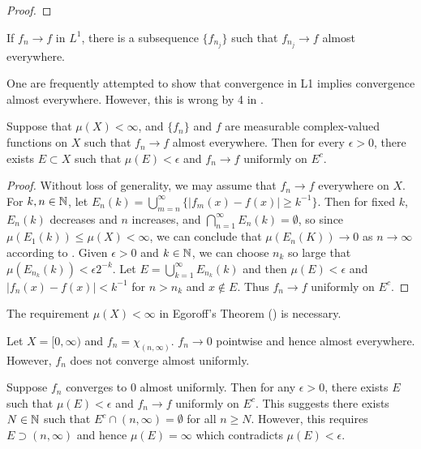 \begin{proof}
    
\end{proof}

\begin{corollary}
    If $f_n \to f$ in $L^1$, there is a subsequence $\{ f_{n_j} \}$ such that $f_{n_j} \to f$ almost everywhere.
\end{corollary}

One are frequently attempted to show that convergence in L1 implies convergence almost everywhere.
However, this is wrong by 4 in .

\begin{theorem}
    Suppose that $\mu(X) < \infty$, and $\{ f_n \}$ and $f$ are measurable complex-valued functions on $X$ such that $f_n \to f$ almost everywhere.
    Then for every $\epsilon > 0$, there exists $E \subset X$ such that $\mu(E) < \epsilon$ and $f_n \to f$ uniformly on $E^c$.
\end{theorem}

\begin{proof}
    Without loss of generality, we may assume that $f_n \to f$ everywhere on $X$. 
    For $k, n \in \mathbb{N}$, let $E_n(k) = \bigcup_{m=n}^{\infty} \{ |f_m(x) - f(x)| \ge k^{-1} \}$.
    Then for fixed $k$, $E_n(k)$ decreases and $n$ increases, and $\bigcap_{n=1}^{\infty} E_n(k) = \emptyset$, so since $\mu(E_1(k)) \le \mu(X) < \infty$, we can conclude that $\mu(E_n(K)) \to 0$ as $n \to \infty$ according to .
    Given $\epsilon > 0$ and $k \in \mathbb{N}$, we can choose $n_k$ so large that $\mu(E_{n_k}(k)) < \epsilon 2^{-k}$.
    Let $E = \bigcup_{k=1}^{\infty} E_{n_k}(k)$ and then $\mu(E) < \epsilon$ and $|f_n(x) - f(x)| < k^{-1}$ for $n > n_k$ and $x \notin E$.
    Thus $f_n \to f$ uniformly on $E^c$.
\end{proof}

\begin{remark}
    The requirement $\mu(X) < \infty$ in Egoroff's Theorem () is necessary.
\end{remark}

Let $X = [0, \infty)$ and $f_n = \chi_{(n, \infty)}$.
$f_n \to 0$ pointwise and hence almost everywhere.
However, $f_n$ does not converge almost uniformly.

Suppose $f_n$ converges to $0$ almost uniformly.
Then for any $\epsilon > 0$, there exists $E$ such that $\mu(E) < \epsilon$ and $f_n \to f$ uniformly on $E^c$.
This suggests there exists $N \in \mathbb{N}$ such that $E^c \cap (n, \infty) = \emptyset$ for all $n \ge N$.
However, this requires $E \supset (n, \infty)$ and hence $\mu(E) = \infty$ which contradicts $\mu(E) < \epsilon$.


